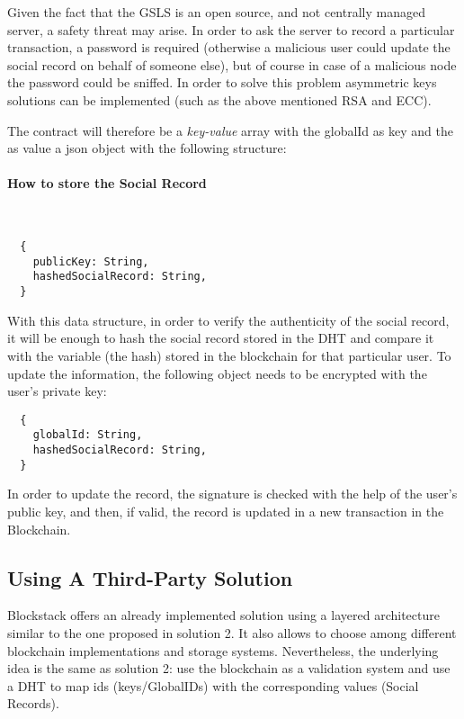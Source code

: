 Given the fact that the GSLS is an open source, and not centrally managed server, a safety threat may arise.
In order to ask the server to record a particular transaction, a password is required (otherwise a malicious user could update the social record on behalf of someone else), but of course in case of a malicious node the password could be sniffed.
In order to solve this problem asymmetric keys solutions can be implemented (such as the above mentioned RSA and ECC).


The contract will therefore be a \textit{key-value} array with the globalId as key and the as value a json object with the following structure:

\paragraph{How to store the Social Record}\
\begin{lstlisting}
  {
	publicKey: String,
	hashedSocialRecord: String,
  }
\end{lstlisting}

With this data structure, in order to verify the authenticity of the social record, it will be enough to hash the social record stored in the DHT and compare it with the variable (the hash) stored in the blockchain for that particular user.
To update the information, the following object needs to be encrypted with the user’s private key:

\begin{lstlisting}
  {
	globalId: String,
	hashedSocialRecord: String,
  }
\end{lstlisting}

In order to update the record, the signature is checked with the help of the user’s public key, and then, if valid, the record is updated in a new transaction in the Blockchain.

\subsection{Using A Third-Party Solution}
Blockstack offers an already implemented solution using a layered architecture similar to the one proposed in solution 2. It also allows to choose among different blockchain implementations and storage systems. Nevertheless, the underlying idea is the same as solution 2: use the blockchain as a validation system and use a DHT to map ids (keys/GlobalIDs) with the corresponding values (Social Records).

